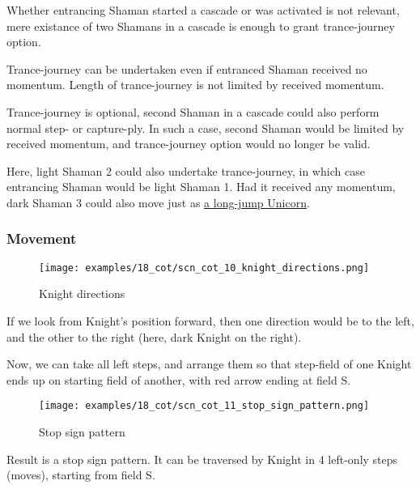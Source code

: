 Whether entrancing Shaman started a cascade or was activated is not relevant,
mere existance of two Shamans in a cascade is enough to grant trance-journey
option.

Trance-journey can be undertaken even if entranced Shaman received no momentum.
Length of trance-journey is not limited by received momentum.

Trance-journey is optional, second Shaman in a cascade could also perform normal
step- or capture-ply. In such a case, second Shaman would be limited by received
momentum, and trance-journey option would no longer be valid.

Here, light Shaman 2 could also undertake trance-journey, in which case entrancing
Shaman would be light Shaman 1.
Had it received any momentum, dark Shaman 3 could also move just as
\hyperref[fig:scn_cot_04_dark_shaman_step_ply]{a long-jump Unicorn}.

\clearpage %

\subsubsection*{Movement}

\noindent
\begin{wrapfigure}[10]{l}{0.4\textwidth}
\centering
\texttt{[image: examples/18\_cot/scn\_cot\_10\_knight\_directions.png]}
\caption{Knight directions}
\label{fig:scn_cot_10_knight_directions}
\end{wrapfigure}
If we look from Knight's position forward, then one direction would be to
the left, and the other to the right (here, dark Knight on the right).

Now, we can take all left steps, and arrange them so that step-field of one
Knight ends up on starting field of another, with red arrow ending at field S.


\vspace*{0.10\textheight}
\noindent
\begin{wrapfigure}[12]{l}{0.4\textwidth}
\centering
\texttt{[image: examples/18\_cot/scn\_cot\_11\_stop\_sign\_pattern.png]}
\caption{Stop sign pattern}
\label{fig:scn_cot_11_stop_sign_pattern}
\end{wrapfigure}
Result is a stop sign pattern. It can be traversed by Knight in 4 left-only
steps (moves), starting from field S.

